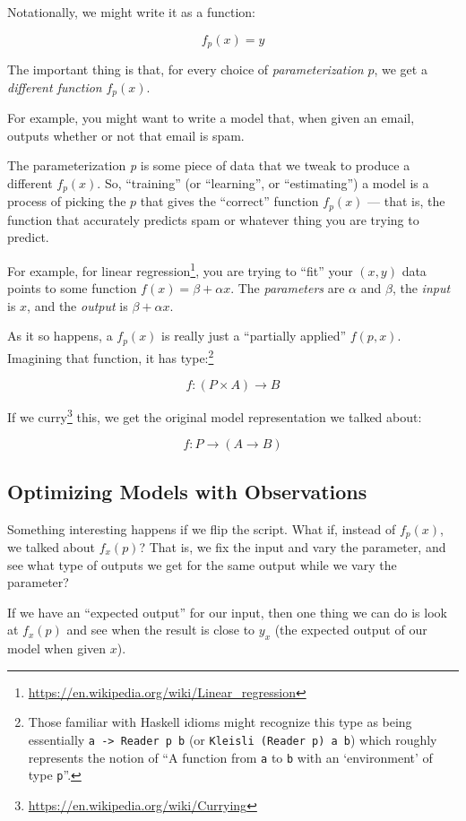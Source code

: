 \documentclass[]{article}
\renewcommand{\href}[2]{#2\footnote{\url{#1}}}
\begin{document}
Notationally, we might write it as a function:

\[
f_p(x) = y
\]

The important thing is that, for every choice of \emph{parameterization} \(p\),
we get a \emph{different function} \(f_p(x)\).

For example, you might want to write a model that, when given an email, outputs
whether or not that email is spam.

The parameterization \emph{p} is some piece of data that we tweak to produce a
different \(f_p(x)\). So, ``training'' (or ``learning'', or ``estimating'') a
model is a process of picking the \(p\) that gives the ``correct'' function
\(f_p(x)\) --- that is, the function that accurately predicts spam or whatever
thing you are trying to predict.

For example, for \href{https://en.wikipedia.org/wiki/Linear_regression}{linear
regression}, you are trying to ``fit'' your \((x, y)\) data points to some
function \(f(x) = \beta + \alpha x\). The \emph{parameters} are \(\alpha\) and
\(\beta\), the \emph{input} is \(x\), and the \emph{output} is \(\beta + \alpha
x\).

As it so happens, a \(f_p(x)\) is really just a ``partially applied''
\(f(p,x)\). Imagining that function, it has type:\footnote{Those familiar with
  Haskell idioms might recognize this type as being essentially
  \texttt{a\ -\textgreater{}\ Reader\ p\ b} (or
  \texttt{Kleisli\ (Reader\ p)\ a\ b}) which roughly represents the notion of
  ``A function from \texttt{a} to \texttt{b} with an `environment' of type
  \texttt{p}''.}

\[
f : (P \times A) \rightarrow B
\]

If we \href{https://en.wikipedia.org/wiki/Currying}{curry} this, we get the
original model representation we talked about:

\[
f : P \rightarrow (A \rightarrow B)
\]

\subsection{Optimizing Models with
Observations}\label{optimizing-models-with-observations}

Something interesting happens if we flip the script. What if, instead of
\(f_p(x)\), we talked about \(f_x(p)\)? That is, we fix the input and vary the
parameter, and see what type of outputs we get for the same output while we vary
the parameter?

If we have an ``expected output'' for our input, then one thing we can do is
look at \(f_x(p)\) and see when the result is close to \(y_x\) (the expected
output of our model when given \(x\)).
\end{document}
